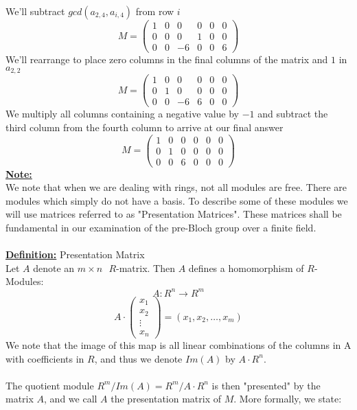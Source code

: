 \documentclass[11pt]{article}
\theoremstyle{plain}
\theoremstyle{definition}
\begin{document}
We'll subtract $gcd(a_{2,4},a_{i,4})$ from row $i$
\[ M = \left( \begin{array}{cccccc}
1 &0&0&0&0&0 \\
0&0&0&1&0&0\\
0&0&-6&0&0&6  
\end{array}\right) \]
We'll rearrange to place zero columns in the final columns of the matrix and $1$ in $a_{2,2}$ 
\[ M = \left( \begin{array}{cccccc}
1 &0&0&0&0&0 \\
0&1&0&0&0&0\\
0&0&-6&6&0&0  
\end{array}\right) \]
We multiply all columns containing a negative value by $-1$ and subtract the third column from the fourth column to arrive at our final answer
\[ M = \left( \begin{array}{cccccc}
1 &0&0&0&0&0 \\
0&1&0&0&0&0\\
0&0&6&0&0&0  
\end{array}\right) \]
\textbf{\underline{Note:}}\\
We note that when we are dealing with rings, not all modules are free. There are modules which simply do not have a basis. To describe some of these modules we will use matrices referred to as "Presentation Matrices". These matrices shall be fundamental in our examination of the pre-Bloch group over a finite field.\\
\\
\textbf{\underline{Definition:}} Presentation Matrix\\
Let $A$ denote an $m \times n\text{ }R$-matrix. Then $A$ defines a  homomorphism of $R$-Modules:
\begin{equation*}
A:R^n \rightarrow R^m
\end{equation*}
\begin{equation*}
A \cdot \begin{pmatrix}
x_1\\
x_2\\
\vdots\\
x_n
\end{pmatrix} = (x_1, x_2, \ldots, x_m)
\end{equation*}
We note that the image of this map is all linear combinations of the columns in A with coefficients in $R$, and thus we denote $Im(A)$ by $A \cdot R^n$.\\
\\
The quotient module $R^m / Im(A) = R^m / A \cdot R^n$ is then "presented" by the matrix $A$, and we call $A$ the presentation matrix of $M$. More formally, we state:\\
\end{document}
